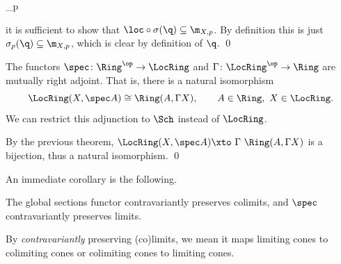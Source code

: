         {\sigma}{\phi_p}{}{\loc}

    it is sufficient to show that $\loc\circ\sigma(\q)\subseteq\m_{X,p}$.
    By definition this is just $\sigma_p(\q)\subseteq\m_{X,p}$, which is clear by definition of $\q$.
    \qed

\eproof

\bcoro[name={specglobsectionadj}]

    The functors $\spec\colon\Ring^\op\to\LocRing$ and $\Gamma\colon\LocRing^\op\to\Ring$ are mutually right adjoint.
    That is, there is a natural isomorphism
    $$ \LocRing(X,\spec A) \cong \Ring(A,\Gamma X),\qquad A\in\Ring,\ X\in\LocRing . $$
    We can restrict this adjunction to $\Sch$ instead of $\LocRing$.

\ecoro

\bproof

    By the previous theorem, $\LocRing(X,\spec A)\xtos\Gamma\Ring(A,\Gamma X)$ is a bijection, thus a natural isomorphism.
    \qed

\eproof

An immediate corollary is the following.

\bcoro[name={specsectlim}]

    The global sections functor contravariantly preserves colimits, and $\spec$ contravariantly preserves limits.

\ecoro

\bnote

    By {\it contravariantly\/} preserving (co)limits, we mean it maps limiting cones to colimiting cones or colimiting cones
    to limiting cones.

\enote


